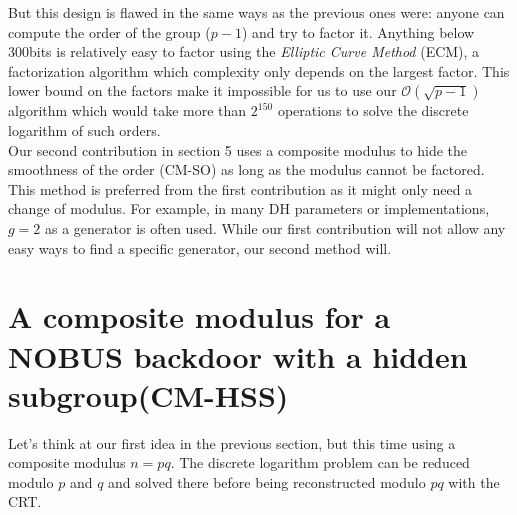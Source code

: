\documentclass[a4paper,11pt,twocolumn]{article}
\begin{document}
But this design is flawed in the same ways as the previous ones were: anyone can compute the order of the group ($p - 1$) and try to factor it. Anything below 300bits is relatively easy to factor using the \emph{Elliptic Curve Method} (ECM), a factorization algorithm which complexity only depends on the largest factor. This lower bound on the factors make it impossible for us to use our $\mathcal{O}(\sqrt{p-1})$ algorithm which would take more than $2^{150}$ operations to solve the discrete logarithm of such orders. \\

Our second contribution in section 5 uses a composite modulus to hide the smoothness of the order (CM-SO) as long as the modulus cannot be factored. This method is preferred from the first contribution as it might only need a change of modulus. For example, in many DH parameters or implementations, $g=2$ as a generator is often used. While our first contribution will not allow any easy ways to find a specific generator, our second method will.

\section{A composite modulus for a NOBUS backdoor with a hidden subgroup(CM-HSS)}

Let's think at our first idea in the previous section, but this time using a composite modulus $n=pq$. The discrete logarithm problem can be reduced modulo $p$ and $q$ and solved there before being reconstructed modulo $pq$ with the CRT.

\begin{center}
\end{center}
\end{document}
